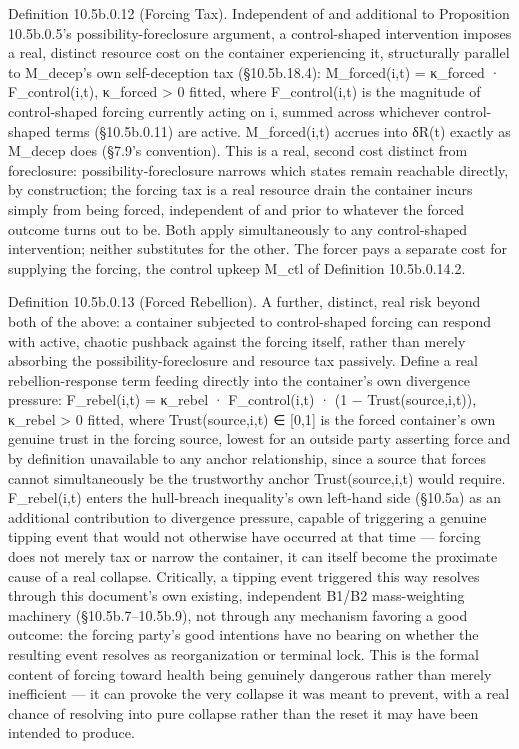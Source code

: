 \documentclass[
]{article}
\begin{document}
Definition 10.5b.0.12 (Forcing Tax). Independent of and additional to
Proposition 10.5b.0.5's possibility-foreclosure argument, a
control-shaped intervention imposes a real, distinct resource cost on
the container experiencing it, structurally parallel to M\_decep's own
self-deception tax (§10.5b.18.4): M\_forced(i,t) = κ\_forced ·
F\_control(i,t), κ\_forced \textgreater{} 0 fitted, where
F\_control(i,t) is the magnitude of control-shaped forcing currently
acting on i, summed across whichever control-shaped terms (§10.5b.0.11)
are active. M\_forced(i,t) accrues into δR(t) exactly as M\_decep does
(§7.9's convention). This is a real, second cost distinct from
foreclosure: possibility-foreclosure narrows which states remain
reachable directly, by construction; the forcing tax is a real resource
drain the container incurs simply from being forced, independent of and
prior to whatever the forced outcome turns out to be. Both apply
simultaneously to any control-shaped intervention; neither substitutes
for the other. The forcer pays a separate cost for supplying the
forcing, the control upkeep M\_ctl of Definition 10.5b.0.14.2.

Definition 10.5b.0.13 (Forced Rebellion). A further, distinct, real risk
beyond both of the above: a container subjected to control-shaped
forcing can respond with active, chaotic pushback against the forcing
itself, rather than merely absorbing the possibility-foreclosure and
resource tax passively. Define a real rebellion-response term feeding
directly into the container's own divergence pressure: F\_rebel(i,t) =
κ\_rebel · F\_control(i,t) · (1 − Trust(source,i,t)), κ\_rebel
\textgreater{} 0 fitted, where Trust(source,i,t) ∈ {[}0,1{]} is the
forced container's own genuine trust in the forcing source, lowest for
an outside party asserting force and by definition unavailable to any
anchor relationship, since a source that forces cannot simultaneously be
the trustworthy anchor Trust(source,i,t) would require. F\_rebel(i,t)
enters the hull-breach inequality's own left-hand side (§10.5a) as an
additional contribution to divergence pressure, capable of triggering a
genuine tipping event that would not otherwise have occurred at that
time --- forcing does not merely tax or narrow the container, it can
itself become the proximate cause of a real collapse. Critically, a
tipping event triggered this way resolves through this document's own
existing, independent B1/B2 mass-weighting machinery
(§10.5b.7--10.5b.9), not through any mechanism favoring a good outcome:
the forcing party's good intentions have no bearing on whether the
resulting event resolves as reorganization or terminal lock. This is the
formal content of forcing toward health being genuinely dangerous rather
than merely inefficient --- it can provoke the very collapse it was
meant to prevent, with a real chance of resolving into pure collapse
rather than the reset it may have been intended to produce.
\end{document}
